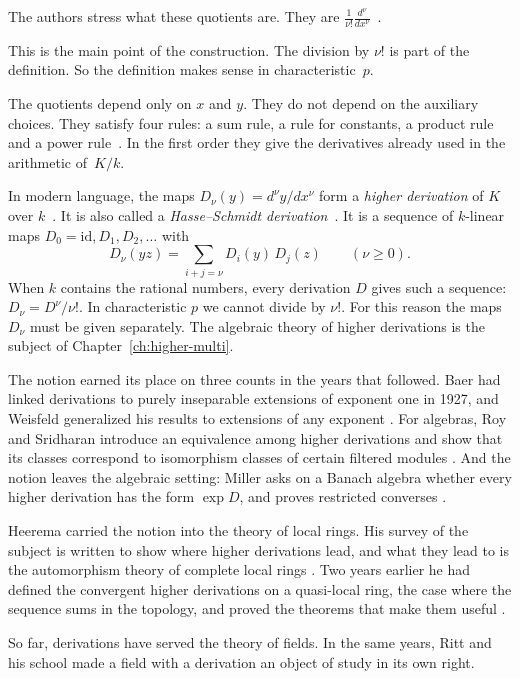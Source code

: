The authors stress what these quotients are. They are 
$\frac{1}{\nu!}\frac{d^\nu}{dx^\nu}$~\cite[p.~217]{HasseSchmidt1937}.

This is the main point of the construction. The division by $\nu!$ is part
of the definition. So the definition makes sense in characteristic~$p$.

The quotients depend only on $x$ and $y$. They do not depend on the
auxiliary choices. They satisfy four rules: a sum rule, a rule for
constants, a product rule and a power
rule~\cite[p.~218, (1)--(4)]{HasseSchmidt1937}. In the first order they give
the derivatives already used in the arithmetic of~$K/k$.

In modern language, the maps $D_\nu(y) = d^\nu y/dx^\nu$ form a \emph{higher derivation} of $K$
over $k$~\cite[p.~218]{HasseSchmidt1937}. It is also called a \emph{Hasse--Schmidt derivation}~\cite[p.~218]{HasseSchmidt1937}. It is a
sequence of $k$-linear maps $D_0 = \mathrm{id}, D_1, D_2, \ldots$ with
\[
D_\nu(yz) = \sum_{i+j=\nu} D_i(y)\, D_j(z) \qquad (\nu \ge 0).
\]
When $k$ contains the rational numbers, every derivation $D$ gives such a
sequence: $D_\nu = D^\nu/\nu!$. In characteristic $p$ we cannot divide by
$\nu!$. For this reason the maps $D_\nu$ must be given separately. The
algebraic theory of higher derivations is the subject of
Chapter~\ref{ch:higher-multi}.

The notion earned its place on three counts in the years that followed. Baer had
linked derivations to purely inseparable extensions of exponent one in 1927, and
Weisfeld generalized his results to extensions of any exponent
\cite[pp.~307--318]{Weisfeld1965Purely}. For algebras, Roy and Sridharan
introduce an equivalence among higher derivations and show that its classes
correspond to isomorphism classes of certain filtered modules
\cite[Introduction, pp.~115--116]{RoySridharan1968Higher}. And the notion leaves
the algebraic setting: Miller asks on a Banach algebra whether every higher
derivation has the form $\exp D$, and proves restricted converses
\cite[pp.~301--331]{Miller1970Higher}.

Heerema carried the notion into the theory of local rings. His survey of the
subject is written to show where higher derivations lead, and what they lead to
is the automorphism theory of complete local rings
\cite[Introduction, p.~1212]{Heerema1970Higher}. Two years earlier he had defined
the convergent higher derivations on a quasi-local ring, the case where the
sequence sums in the topology, and proved the theorems that make them useful
\cite[Introduction, p.~31]{Heerema1968Convergent}.

So far, derivations have served the theory of fields. In the same years, Ritt
and his school made a field with a derivation an object of study in its own
right.
